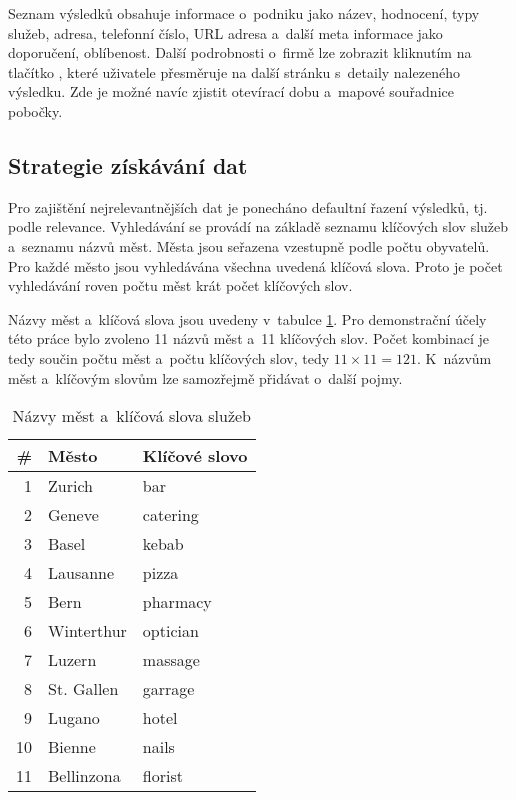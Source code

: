 \documentclass[11pt,a4paper]{article}
\begin{document}
Seznam výsledků obsahuje informace o~podniku jako název, hodnocení, typy služeb, adresa, telefonní číslo, URL adresa a~další meta informace jako doporučení, oblíbenost. Další podrobnosti o~firmě lze zobrazit kliknutím na tlačítko , které uživatele přesměruje na další stránku s~detaily nalezeného výsledku. Zde je možné navíc zjistit otevírací dobu a~mapové souřadnice pobočky.

\subsection{Strategie získávání dat}
Pro zajištění nejrelevantnějších dat je ponecháno defaultní řazení výsledků, tj. podle relevance. Vyhledávání se provádí na základě seznamu klíčových slov služeb a~seznamu názvů měst. Města jsou seřazena vzestupně podle počtu obyvatelů. Pro každé město jsou vyhledávána všechna uvedená klíčová slova. Proto je počet vyhledávání roven počtu měst krát počet klíčových slov. 

Názvy měst a~klíčová slova jsou uvedeny v~tabulce \ref{cityandkeywords}. Pro demonstrační účely této práce bylo zvoleno 11 názvů měst a~11 klíčových slov. Počet kombinací je tedy součin počtu měst a~počtu klíčových slov, tedy $ 11 \times 11 = 121 $. K~názvům měst a~klíčovým slovům lze samozřejmě přidávat o~další pojmy.

\begin{table}[ht]
\centering
\begin{tabular}{rll}
\textbf{\#} & \textbf{Město} & \textbf{Klíčové slovo}                                        \\
\hline
1  & Zurich                             & bar                                        \\
2  & Geneve                             & catering                                   \\
3  & Basel                              & kebab                                      \\
4  & Lausanne                           & pizza                                      \\
5  & Bern                               & pharmacy                                   \\
6  & Winterthur                         & optician                                   \\
7  & Luzern                             & massage                                    \\
8  & St. Gallen                         & garrage                                    \\
9  & Lugano                             & hotel                                      \\
10 & Bienne                             & nails                                      \\
11 & Bellinzona                         & florist           
\end{tabular}
\caption{Názvy měst a~klíčová slova služeb}
\label{cityandkeywords}
\end{table}
\end{document}
